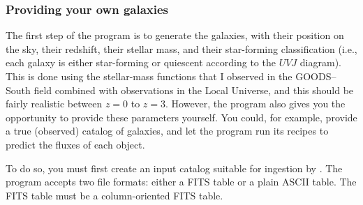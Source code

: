 \documentclass[12pt,a4paper]{article}
\newcommand{\uvj}{$UVJ$\xspace}
\begin{document}
\subsubsection{Providing your own galaxies}
The first step of the program is to generate the galaxies, with their position on the sky, their redshift, their stellar mass, and their star-forming classification (i.e., each galaxy is either star-forming or quiescent according to the \uvj diagram). This is done using the stellar-mass functions that I observed in the GOODS--South field combined with observations in the Local Universe, and this should be fairly realistic between $z=0$ to $z=3$. However, the program also gives you the opportunity to provide these parameters yourself. You could, for example, provide a true (observed) catalog of galaxies, and let the program run its recipes to predict the fluxes of each object.

To do so, you must first create an input catalog suitable for ingestion by . The program accepts two file formats: either a FITS table or a plain ASCII table. The FITS table must be a column-oriented FITS table.

\subsection{}
\subsection{}
\subsection{}
\subsection{}
\end{document}
